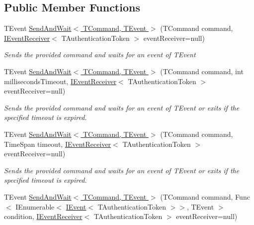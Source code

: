 \subsection*{Public Member Functions}
\begin{DoxyCompactItemize}
\item 
T\+Event \hyperlink{interfaceCqrs_1_1Commands_1_1ISendAndWaitCommandSender_ab64dd5144f0688b0e23ffe289d4ffa2e_ab64dd5144f0688b0e23ffe289d4ffa2e}{Send\+And\+Wait$<$ T\+Command, T\+Event $>$} (T\+Command command, \hyperlink{interfaceCqrs_1_1Events_1_1IEventReceiver}{I\+Event\+Receiver}$<$ T\+Authentication\+Token $>$ event\+Receiver=null)
\begin{DoxyCompactList}\small\item\em Sends the provided {\itshape command}  and waits for an event of {\itshape T\+Event}  \end{DoxyCompactList}\item 
T\+Event \hyperlink{interfaceCqrs_1_1Commands_1_1ISendAndWaitCommandSender_aceee36522f8b677f3737ff0f9f2165ad_aceee36522f8b677f3737ff0f9f2165ad}{Send\+And\+Wait$<$ T\+Command, T\+Event $>$} (T\+Command command, int milliseconds\+Timeout, \hyperlink{interfaceCqrs_1_1Events_1_1IEventReceiver}{I\+Event\+Receiver}$<$ T\+Authentication\+Token $>$ event\+Receiver=null)
\begin{DoxyCompactList}\small\item\em Sends the provided {\itshape command}  and waits for an event of {\itshape T\+Event}  or exits if the specified timeout is expired. \end{DoxyCompactList}\item 
T\+Event \hyperlink{interfaceCqrs_1_1Commands_1_1ISendAndWaitCommandSender_ada9643fbf8206bcc72cc5817f747ada8_ada9643fbf8206bcc72cc5817f747ada8}{Send\+And\+Wait$<$ T\+Command, T\+Event $>$} (T\+Command command, Time\+Span timeout, \hyperlink{interfaceCqrs_1_1Events_1_1IEventReceiver}{I\+Event\+Receiver}$<$ T\+Authentication\+Token $>$ event\+Receiver=null)
\begin{DoxyCompactList}\small\item\em Sends the provided {\itshape command}  and waits for an event of {\itshape T\+Event}  or exits if the specified timeout is expired. \end{DoxyCompactList}\item 
T\+Event \hyperlink{interfaceCqrs_1_1Commands_1_1ISendAndWaitCommandSender_abc9bda930a4c8c57d8edf1044d2b8002_abc9bda930a4c8c57d8edf1044d2b8002}{Send\+And\+Wait$<$ T\+Command, T\+Event $>$} (T\+Command command, Func$<$ I\+Enumerable$<$ \hyperlink{interfaceCqrs_1_1Events_1_1IEvent}{I\+Event}$<$ T\+Authentication\+Token $>$$>$, T\+Event $>$ condition, \hyperlink{interfaceCqrs_1_1Events_1_1IEventReceiver}{I\+Event\+Receiver}$<$ T\+Authentication\+Token $>$ event\+Receiver=null)
$$
\end{DoxyCompactItemize}

